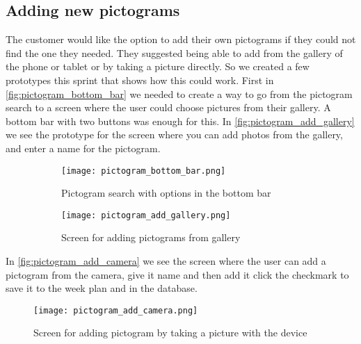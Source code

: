 \subsection{Adding new pictograms}
The customer would like the option to add their own pictograms if they could not find the one they needed. They suggested being able to add from the gallery of the phone or tablet or by taking a picture directly. So we created a few prototypes this sprint that shows how this could work. First in \autoref{fig:pictogram_bottom_bar} we needed to create a way to go from the pictogram search to a screen where the user could choose pictures from their gallery.
A bottom bar with two buttons was enough for this. In \autoref{fig:pictogram_add_gallery} we see the prototype for the screen where you can add photos from the gallery, and enter a name for the pictogram.
\begin{figure}[H]
    \begin{subfigure}{0.5\textwidth}
    \texttt{[image: pictogram\_bottom\_bar.png]} 
    \caption{Pictogram search with options in the bottom bar}
    \label{fig:pictogram_bottom_bar}
    \end{subfigure}
    \begin{subfigure}{0.5\textwidth}
        \texttt{[image: pictogram\_add\_gallery.png]}
    \caption{Screen for adding pictograms from gallery}
    \label{fig:pictogram_add_gallery}
    \end{subfigure} 
    \caption{}
    \label{fig:pictogram_bottom_bar_and_pictogram_add_gallery}
\end{figure}
\noindent
In \autoref{fig:pictogram_add_camera} we see the screen where the user can add a pictogram from the camera, give it name and then add it click the checkmark to save it to the week plan and in the database.

\begin{figure}
    \centering
    \texttt{[image: pictogram\_add\_camera.png]}
    \caption{Screen for adding pictogram by taking a picture with the device}
    \label{fig:pictogram_add_camera}
\end{figure}